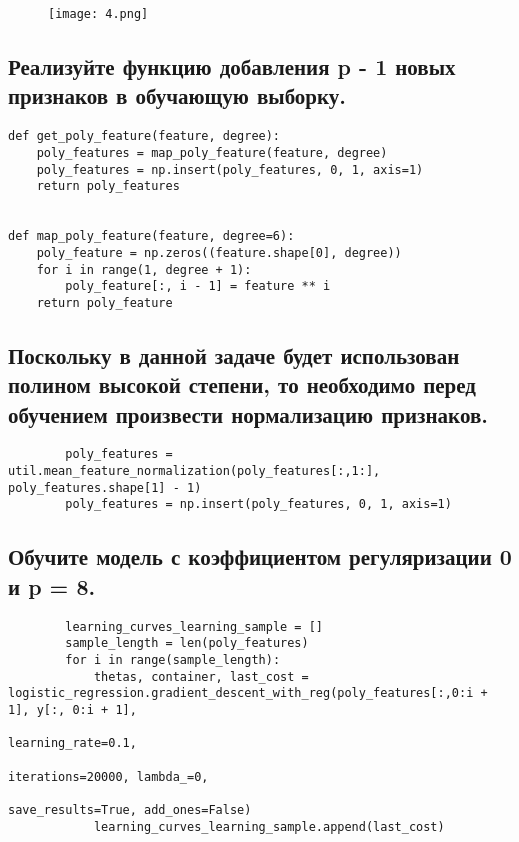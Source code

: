 \begin{figure}[h]
\centering
	\texttt{[image: 4.png]}
	\label{sec:purpose:payings}
\end{figure}

\subsection{Реализуйте функцию добавления p - 1 новых признаков в обучающую выборку.}

\begin{lstlisting}
def get_poly_feature(feature, degree):
    poly_features = map_poly_feature(feature, degree)
    poly_features = np.insert(poly_features, 0, 1, axis=1)
    return poly_features


def map_poly_feature(feature, degree=6):
    poly_feature = np.zeros((feature.shape[0], degree))
    for i in range(1, degree + 1):
        poly_feature[:, i - 1] = feature ** i
    return poly_feature
\end{lstlisting}

\subsection{Поскольку в данной задаче будет использован полином высокой степени, то необходимо перед обучением произвести нормализацию признаков.}

\begin{lstlisting}
		poly_features = util.mean_feature_normalization(poly_features[:,1:], poly_features.shape[1] - 1)
        poly_features = np.insert(poly_features, 0, 1, axis=1)
\end{lstlisting}

\subsection{Обучите модель с коэффициентом регуляризации 0 и p = 8.}

\begin{lstlisting}
		learning_curves_learning_sample = []
        sample_length = len(poly_features)
        for i in range(sample_length):
            thetas, container, last_cost = logistic_regression.gradient_descent_with_reg(poly_features[:,0:i + 1], y[:, 0:i + 1],
                                                                              learning_rate=0.1,
                                                                              iterations=20000, lambda_=0,
                                                                              save_results=True, add_ones=False)
            learning_curves_learning_sample.append(last_cost)
\end{lstlisting}

